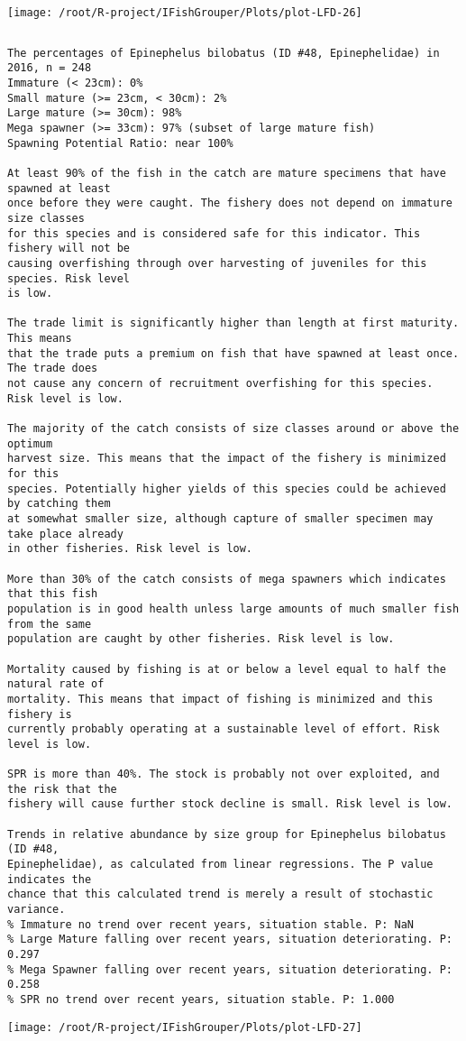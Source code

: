 \documentclass{report}\usepackage[]{graphicx}\usepackage[]{color}
\makeatletter
\def\maxwidth{ %
  \ifdim\Gin@nat@width>\linewidth
    \linewidth
  \else
    \Gin@nat@width
  \fi
}
\newenvironment{kframe}{%
 \def\at@end@of@kframe{}%
 \ifinner\ifhmode%
  \def\at@end@of@kframe{\end{minipage}}%
  \begin{minipage}{\columnwidth}%
 \fi\fi%
 \def\FrameCommand##1{\hskip\@totalleftmargin \hskip-\fboxsep
 \colorbox{shadecolor}{##1}\hskip-\fboxsep
     \hskip-\linewidth \hskip-\@totalleftmargin \hskip\columnwidth}%
 \MakeFramed {\advance\hsize-\width
   \@totalleftmargin\z@ \linewidth\hsize
   \@setminipage}}%
 {\par\unskip\endMakeFramed%
 \at@end@of@kframe}
\newenvironment{knitrout}{}{} %
\makeatother
\begin{document}
\begin{knitrout}
\texttt{[image: /root/R-project/IFishGrouper/Plots/plot-LFD-26]} 
\begin{kframe}\begin{verbatim}
\end{verbatim}
\end{kframe}
\clearpage
\newpage
\begin{kframe}\begin{verbatim}The percentages of Epinephelus bilobatus (ID #48, Epinephelidae) in 2016, n = 248
Immature (< 23cm): 0%
Small mature (>= 23cm, < 30cm): 2%
Large mature (>= 30cm): 98%
Mega spawner (>= 33cm): 97% (subset of large mature fish)
Spawning Potential Ratio: near 100%
 
At least 90% of the fish in the catch are mature specimens that have spawned at least
once before they were caught. The fishery does not depend on immature size classes
for this species and is considered safe for this indicator. This fishery will not be
causing overfishing through over harvesting of juveniles for this species. Risk level
is low.

The trade limit is significantly higher than length at first maturity.  This means
that the trade puts a premium on fish that have spawned at least once. The trade does
not cause any concern of recruitment overfishing for this species. Risk level is low.

The majority of the catch consists of size classes around or above the optimum
harvest size. This means that the impact of the fishery is minimized for this
species. Potentially higher yields of this species could be achieved by catching them
at somewhat smaller size, although capture of smaller specimen may take place already
in other fisheries. Risk level is low.

More than 30% of the catch consists of mega spawners which indicates that this fish
population is in good health unless large amounts of much smaller fish from the same
population are caught by other fisheries. Risk level is low.
 
Mortality caused by fishing is at or below a level equal to half the natural rate of
mortality. This means that impact of fishing is minimized and this fishery is
currently probably operating at a sustainable level of effort. Risk level is low.
 
SPR is more than 40%. The stock is probably not over exploited, and the risk that the
fishery will cause further stock decline is small. Risk level is low.
 
Trends in relative abundance by size group for Epinephelus bilobatus (ID #48,
Epinephelidae), as calculated from linear regressions. The P value indicates the
chance that this calculated trend is merely a result of stochastic variance.
% Immature no trend over recent years, situation stable. P: NaN
% Large Mature falling over recent years, situation deteriorating. P: 0.297
% Mega Spawner falling over recent years, situation deteriorating. P: 0.258
% SPR no trend over recent years, situation stable. P: 1.000
\end{verbatim}
\end{kframe}
\texttt{[image: /root/R-project/IFishGrouper/Plots/plot-LFD-27]} 


\end{knitrout}
\end{document}

